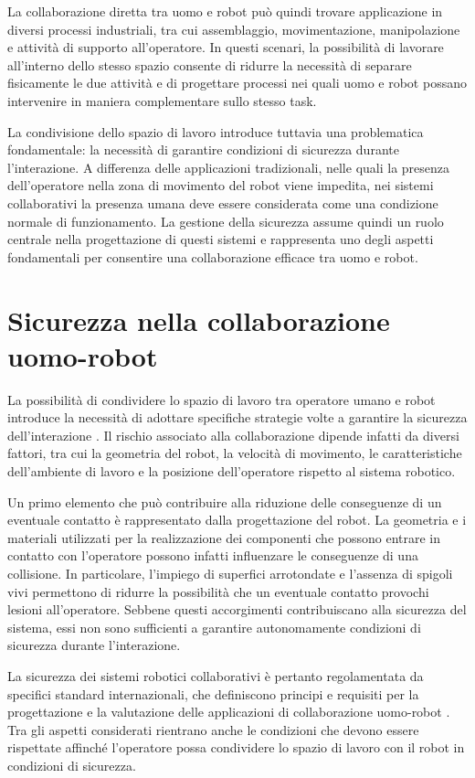 La collaborazione diretta tra uomo e robot può quindi trovare applicazione in diversi processi industriali, tra cui assemblaggio, movimentazione, manipolazione e attività di supporto all'operatore. In questi scenari, la possibilità di lavorare all'interno dello stesso spazio consente di ridurre la necessità di separare fisicamente le due attività e di progettare processi nei quali uomo e robot possano intervenire in maniera complementare sullo stesso task.

La condivisione dello spazio di lavoro introduce tuttavia una problematica fondamentale: la necessità di garantire condizioni di sicurezza durante l'interazione. A differenza delle applicazioni tradizionali, nelle quali la presenza dell'operatore nella zona di movimento del robot viene impedita, nei sistemi collaborativi la presenza umana deve essere considerata come una condizione normale di funzionamento. La gestione della sicurezza assume quindi un ruolo centrale nella progettazione di questi sistemi e rappresenta uno degli aspetti fondamentali per consentire una collaborazione efficace tra uomo e robot.

\section{Sicurezza nella collaborazione uomo-robot}

La possibilità di condividere lo spazio di lavoro tra operatore umano e robot introduce la necessità di adottare specifiche strategie volte a garantire la sicurezza dell'interazione \cite{Li2024}. Il rischio associato alla collaborazione dipende infatti da diversi fattori, tra cui la geometria del robot, la velocità di movimento, le caratteristiche dell'ambiente di lavoro e la posizione dell'operatore rispetto al sistema robotico.

Un primo elemento che può contribuire alla riduzione delle conseguenze di un eventuale contatto è rappresentato dalla progettazione del robot. La geometria e i materiali utilizzati per la realizzazione dei componenti che possono entrare in contatto con l'operatore possono infatti influenzare le conseguenze di una collisione. In particolare, l'impiego di superfici arrotondate e l'assenza di spigoli vivi permettono di ridurre la possibilità che un eventuale contatto provochi lesioni all'operatore. Sebbene questi accorgimenti contribuiscano alla sicurezza del sistema, essi non sono sufficienti a garantire autonomamente condizioni di sicurezza durante l'interazione.

La sicurezza dei sistemi robotici collaborativi è pertanto regolamentata da specifici standard internazionali, che definiscono principi e requisiti per la progettazione e la valutazione delle applicazioni di collaborazione uomo-robot \cite{ISO15066}. Tra gli aspetti considerati rientrano anche le condizioni che devono essere rispettate affinché l'operatore possa condividere lo spazio di lavoro con il robot in condizioni di sicurezza.

